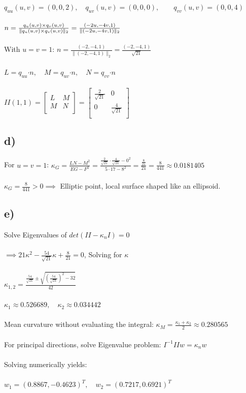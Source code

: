 \documentclass{article}
\begin{document}
	$q_{uu}(u,v) = (0, 0, 2), \quad q_{uv}(u,v) = (0, 0, 0), \qquad q_{vv}(u,v) = (0, 0, 4)$\\
	\\
	$n = \frac{q_u(u,v)\times q_v(u,v)}{\|q_u(u,v)\times q_v(u,v)\|_2} = \frac{(-2u,-4v,1)}{\|(-2u,-4v,1)\|_2}$\\
	\\
	With $u=v=1$: $n=\frac{(-2,-4,1)}{\|(-2,-4,1)\|_2} = \frac{(-2,-4,1)}{\sqrt{21}}$ \\
	\\
	$L = q_{uu}\boldsymbol{\cdot} n, \quad M = q_{uv}\boldsymbol{\cdot} n, \quad N = q_{vv}\boldsymbol{\cdot} n$\\
	\\
	$II(1,1)= \left [
	\begin{array}{cc}
		L & M \\
		M & N \\
	\end{array}
	\right ] = 
	\left [
	\begin{array}{cc}
		\frac{2}{\sqrt{21}} & 0 \\
		0 & \frac{4}{\sqrt{21}} \\
	\end{array}
	\right ] $

\subsection*{d)}

	For $u=v=1$: $\kappa_G = \frac{LN-M^2}{EG-F^2} = \frac{\frac{2}{\sqrt{21}}\cdot \frac{4}{\sqrt{21}} - 0^2}{5\cdot 17-8^2} = \frac{\frac{8}{21}}{21} = \frac{8}{441}\approx 0.0181405$\\
	\\
	$\kappa_G = \frac{8}{441} > 0 \implies$ Elliptic point, local surface shaped like an
	ellipsoid.

\subsection*{e)}

	Solve Eigenvalues of $det(II-\kappa_nI) = 0$\\
	\\
	$\implies 21\kappa^2-\frac{54}{\sqrt{21}}\kappa + \frac{8}{21} = 0$, Solving for $\kappa$\\
	\\
	$\kappa_{1,2} = \frac{\frac{54}{\sqrt{21}}\pm \sqrt{(\frac{54}{\sqrt{21}})^2-32}}{42}$\\
	\\
	$\kappa_1\approx 0.526689, \quad \kappa_2\approx 0.034442$\\
	\\
	Mean curvature without evaluating the integral: $\kappa_M = \frac{\kappa_1 + \kappa_2}{2} \approx 0.280565$\\
	\\
	For principal directions, solve Eigenvalue problem: $I^{-1}IIw=\kappa_nw$\\
	\\
	Solving numerically yields:\\
	\\
	$w_1 = (0.8867, -0.4623)^T, \quad w_2 = (0.7217, 0.6921)^T$
\end{document}
